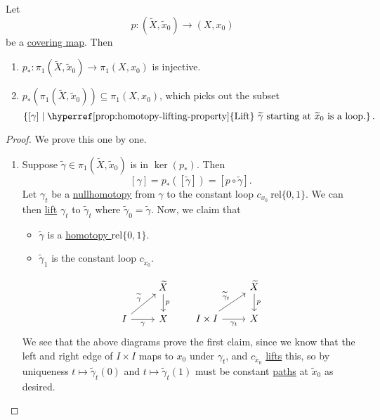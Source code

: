 \begin{proposition}
	Let
	\[
		p\colon (\widetilde{X} , \widetilde{x} _0)\to (X, x_0)
	\]
	be a \hyperref[def:covering-map]{covering map}. Then
	\begin{enumerate}
		\item \(p_*\colon \pi _1(\widetilde{X} , \widetilde{x} _0)\to \pi _1(X, x_0)\) is injective.
		\item \(p_*(\pi _1(\widetilde{X} , \widetilde{x} _0))\subseteq \pi _1(X, x_0)\), which picks out the subset
		      \[
			      \left\{[\gamma ] \mid \text{\hyperref[prop:homotopy-lifting-property]{Lift} \(\widetilde{\gamma} \) starting at \(\widetilde{x} _0\) is a loop.} \right\}.
		      \]
	\end{enumerate}
\end{proposition}
\begin{proof}
	We prove this one by one.
	\begin{enumerate}
		\item Suppose \(\widetilde{\gamma} \in \pi _1(\widetilde{X} , \widetilde{x} _0)\) is in \(\ker (p_*) \). Then
		      \[
			      [\gamma] =p_*([\widetilde{\gamma} ]) = \left[p \circ \widetilde{\gamma} \right].
		      \]
		      Let \(\gamma _{t}\) be a \hyperref[def:nullhomotopic]{nullhomotopy} from \(\gamma \) to the constant loop \(c_{x_0}\ \mathrm{rel} \{0, 1\}\).
		      We can then \hyperref[prop:homotopy-lifting-property]{lift} \(\gamma _{t}\) to \(\widetilde{\gamma} _{t}\) where \(\widetilde{\gamma} _0 = \widetilde{\gamma} \).
		      Now, we claim that
		      \begin{itemize}
			      \item \(\widetilde{\gamma} \) is a \hyperref[def:homotopy-relative]{homotopy \(\mathrm{rel} \{0, 1\}\)}.
			      \item \(\widetilde{\gamma} _1\) is the constant loop \(c_{\widetilde{x} _0}\).
		      \end{itemize}
		      \[
			      \begin{tikzcd}
				      & {\widetilde{X}} \\
				      I & X
				      \arrow["{\widetilde{\gamma}}", from=2-1, to=1-2]
				      \arrow["p", from=1-2, to=2-2]
				      \arrow["\gamma"', from=2-1, to=2-2]
			      \end{tikzcd}\qquad
			      \begin{tikzcd}
				      & {\widetilde{X}} \\
				      {I\times I} & X
				      \arrow["{\widetilde{\gamma}_t}", from=2-1, to=1-2]
				      \arrow["p", from=1-2, to=2-2]
				      \arrow["{\gamma_t}"', from=2-1, to=2-2]
			      \end{tikzcd}
		      \]
		      We see that the above diagrams prove the first claim, since we know that the left and right edge of \(I\times I\) maps to \(x_0\) under
		      \(\gamma _{t}\), and \(c_{\widetilde{x} _0}\) \hyperref[prop:homotopy-lifting-property]{lifts} this, so by uniqueness \(t\mapsto \widetilde{\gamma} _t(0)\) and
		      \(t\mapsto \widetilde{\gamma} _{t}(1)\) must be constant \hyperref[def:path]{paths} at \(\widetilde{x} _0\) as desired.


\end{enumerate}
\end{proof}
